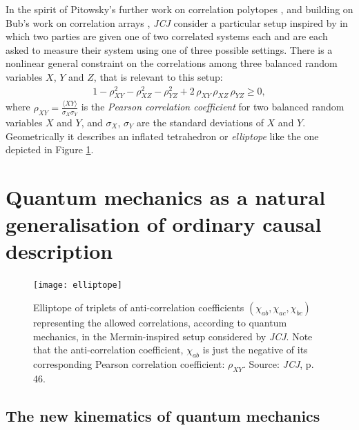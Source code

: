 \documentclass[12pt,english,twoside]{article}
\numberwithin{equation}{section}
\begin{document}
In the spirit of Pitowsky's further work on correlation polytopes \citep[]{pitowsky1989, pitowsky1991, pitowsky2008}, and building on Bub's work on correlation arrays \citep[]{bub2016}, \emph{JCJ} consider a particular setup inspired by \citet[]{mermin1981} in which two parties are given one of two correlated systems each and are each asked to measure their system using one of three possible settings. There is a nonlinear general constraint on the correlations among three balanced random variables $X$, $Y$ and $Z$, that is relevant to this setup:
\begin{align}
  \label{eq:genconst}
  \quad 1 - \rho_{XY}^2 - \rho_{XZ}^2 - \rho_{YZ}^2 + 2 \, \rho_{XY} \, \rho_{XZ} \,
  \rho_{YZ} \ge 0,\quad
\end{align}
where $\rho_{XY} = \frac{\langle XY \rangle}{\sigma_X\sigma_Y}$ is the \emph{Pearson correlation coefficient} for two balanced random variables $X$ and $Y$, and $\sigma_X$, $\sigma_Y$ are the standard deviations of $X$ and $Y$. Geometrically it describes an inflated tetrahedron or \emph{elliptope} like the one depicted in Figure \ref{fig:elliptope}.

\section{Quantum mechanics as a natural generalisation of ordinary causal description}
\label{sec:natural_generalisation}

\begin{figure}[t]
 \centering
   \texttt{[image: elliptope]} 
   \caption{Elliptope of triplets of anti-correlation coefficients $(\chi_{ab}, \chi_{ac}, \chi_{bc})$ representing the allowed correlations, according to quantum mechanics, in the Mermin-inspired setup considered by \emph{JCJ}. Note that the anti-correlation coefficient, $\chi_{ab}$ is just the negative of its corresponding Pearson correlation coefficient: $\rho_{XY}$. Source: \emph{JCJ}, p. 46.}
   \label{fig:elliptope}
    \vspace{-.4cm}
\end{figure}

\subsection{The new kinematics of quantum mechanics}
\label{sec:new_kinematics}
\end{document}

